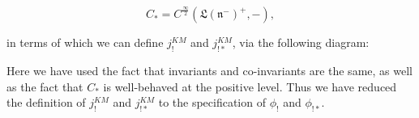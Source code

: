\documentclass[12pt]{amsart}
\newcommand\LT{\mathfrak{LT}}
\newcommand\LNm{\mathfrak{L}(\mathfrak{N}^-)}
\newcommand\Lnm{\mathfrak{L}(\mathfrak{n}^-)}
\newcommand\LG{\mathfrak{LG}}
\newcommand\afftmod{\hat{\mathfrak{t}}-\mathbf{Mod}}
\newcommand\affgmod{\hat{\mathfrak{g}}-\mathbf{Mod}}
\newcommand\KL{\mathbf{KL}}
\newcommand\poslv{\kappa}
\begin{document}
  $$C_* = C^{\frac{\infty}{2}}(\Lnm^+, -),$$

  in terms of which we can define $j_!^{KM}$ and $j_{!*}^{KM}$, via the following diagram:


Here we have used the fact that invariants and co-invariants are the same, as
well as the fact that $C_*$ is well-behaved at the positive level. Thus we have
reduced the definition of $j_!^{KM}$ and $j_{!*}^{KM}$ to the specification of
$\phi_!$ and $\phi_{!*}$.
\end{document}
